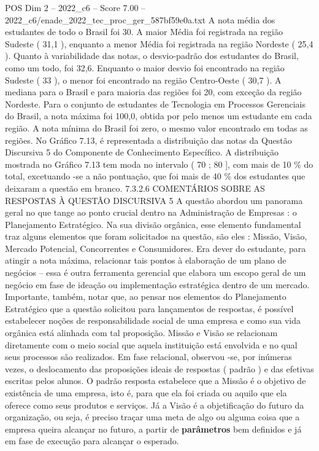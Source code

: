 \begin{textsample}{POS Dim 2 – 2022\_c6 – Score 7.00 – 2022\_c6/enade\_2022\_tec\_proc\_ger\_587bf59e0a.txt}
A nota média dos estudantes de todo o Brasil foi 30.
A maior Média foi registrada na região Sudeste ( 31,1 ), enquanto a menor Média foi registrada na região Nordeste ( 25,4 ).
Quanto à variabilidade das notas, o desvio-padrão dos estudantes do Brasil, como um todo, foi 32,6.
Enquanto o maior desvio foi encontrado na região Sudeste ( 33 ), o menor foi encontrado na região Centro-Oeste ( 30,7 ).
A mediana para o Brasil e para maioria das regiões foi 20, com exceção da região Nordeste.
Para o conjunto de estudantes de Tecnologia em Processos Gerenciais do Brasil, a nota máxima foi 100,0, obtida por pelo menos um estudante em cada região.
A nota mínima do Brasil foi zero, o mesmo valor encontrado em todas as regiões.
No Gráfico 7.13, é representada a distribuição das notas da Questão Discursiva 5 do Componente de Conhecimento Específico.
A distribuição mostrada no Gráfico 7.13 tem moda no intervalo ( 70 ; 80 ], com mais de 10 \% do total, excetuando -se a não pontuação, que foi mais de 40 \% dos estudantes que deixaram a questão em branco. 7.3.2.6 COMENTÁRIOS SOBRE AS RESPOSTAS À QUESTÃO DISCURSIVA 5 A questão abordou um panorama geral no que tange ao ponto crucial dentro na Administração de Empresas : o Planejamento Estratégico.
Na sua divisão orgânica, esse elemento fundamental traz alguns elementos que foram solicitados na questão, são eles : Missão, Visão, Mercado Potencial, Concorrentes e Consumidores.
Era dever do estudante, para atingir a nota máxima, relacionar tais pontos à elaboração de um plano de negócios – essa é outra ferramenta gerencial que elabora um escopo geral de um negócio em fase de ideação ou implementação estratégica dentro de um mercado.
Importante, também, notar que, ao pensar nos elementos do Planejamento Estratégico que a questão solicitou para lançamentos de respostas, é possível estabelecer noções de responsabilidade social de uma empresa e como sua vida orgânica está alinhada com tal proposição.
Missão e Visão se relacionam diretamente com o meio social que aquela instituição está envolvida e no qual seus processos são realizados.
Em fase relacional, observou -se, por inúmeras vezes, o deslocamento das proposições ideais de respostas ( padrão ) e das efetivas escritas pelos alunos.
O padrão resposta estabelece que a Missão é o objetivo de existência de uma empresa, isto é, para que ela foi criada ou aquilo que ela oferece como seus produtos e serviços.
Já a Visão é a objetificação do futuro da organização, ou seja, é preciso traçar uma meta de algo ou alguma coisa que a empresa queira alcançar no futuro, a partir de \textbf{parâmetros} bem definidos e já em fase de execução para alcançar o esperado.

\end{textsample}
